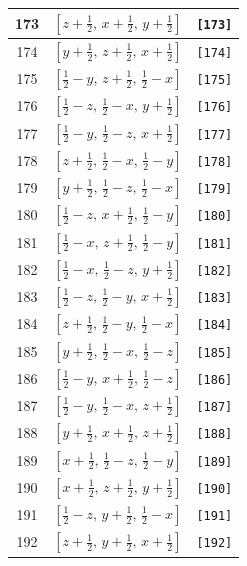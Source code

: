 \documentclass[fleqn,8pt]{jsarticle}
\begin{document}
\begin{longtable}{ccc}
173 & $\left[ z + \frac{1}{2},\, x + \frac{1}{2},\, y + \frac{1}{2} \right]$ & {\tt [173]} \\ \hline
174 & $\left[ y + \frac{1}{2},\, z + \frac{1}{2},\, x + \frac{1}{2} \right]$ & {\tt [174]} \\ \hline
175 & $\left[ \frac{1}{2} - y,\, z + \frac{1}{2},\, \frac{1}{2} - x \right]$ & {\tt [175]} \\ \hline
176 & $\left[ \frac{1}{2} - z,\, \frac{1}{2} - x,\, y + \frac{1}{2} \right]$ & {\tt [176]} \\ \hline
177 & $\left[ \frac{1}{2} - y,\, \frac{1}{2} - z,\, x + \frac{1}{2} \right]$ & {\tt [177]} \\ \hline
178 & $\left[ z + \frac{1}{2},\, \frac{1}{2} - x,\, \frac{1}{2} - y \right]$ & {\tt [178]} \\ \hline
179 & $\left[ y + \frac{1}{2},\, \frac{1}{2} - z,\, \frac{1}{2} - x \right]$ & {\tt [179]} \\ \hline
180 & $\left[ \frac{1}{2} - z,\, x + \frac{1}{2},\, \frac{1}{2} - y \right]$ & {\tt [180]} \\ \hline
181 & $\left[ \frac{1}{2} - x,\, z + \frac{1}{2},\, \frac{1}{2} - y \right]$ & {\tt [181]} \\ \hline
182 & $\left[ \frac{1}{2} - x,\, \frac{1}{2} - z,\, y + \frac{1}{2} \right]$ & {\tt [182]} \\ \hline
183 & $\left[ \frac{1}{2} - z,\, \frac{1}{2} - y,\, x + \frac{1}{2} \right]$ & {\tt [183]} \\ \hline
184 & $\left[ z + \frac{1}{2},\, \frac{1}{2} - y,\, \frac{1}{2} - x \right]$ & {\tt [184]} \\ \hline
185 & $\left[ y + \frac{1}{2},\, \frac{1}{2} - x,\, \frac{1}{2} - z \right]$ & {\tt [185]} \\ \hline
186 & $\left[ \frac{1}{2} - y,\, x + \frac{1}{2},\, \frac{1}{2} - z \right]$ & {\tt [186]} \\ \hline
187 & $\left[ \frac{1}{2} - y,\, \frac{1}{2} - x,\, z + \frac{1}{2} \right]$ & {\tt [187]} \\ \hline
188 & $\left[ y + \frac{1}{2},\, x + \frac{1}{2},\, z + \frac{1}{2} \right]$ & {\tt [188]} \\ \hline
189 & $\left[ x + \frac{1}{2},\, \frac{1}{2} - z,\, \frac{1}{2} - y \right]$ & {\tt [189]} \\ \hline
190 & $\left[ x + \frac{1}{2},\, z + \frac{1}{2},\, y + \frac{1}{2} \right]$ & {\tt [190]} \\ \hline
191 & $\left[ \frac{1}{2} - z,\, y + \frac{1}{2},\, \frac{1}{2} - x \right]$ & {\tt [191]} \\ \hline
192 & $\left[ z + \frac{1}{2},\, y + \frac{1}{2},\, x + \frac{1}{2} \right]$ & {\tt [192]} \\
\end{longtable}
\end{document}
